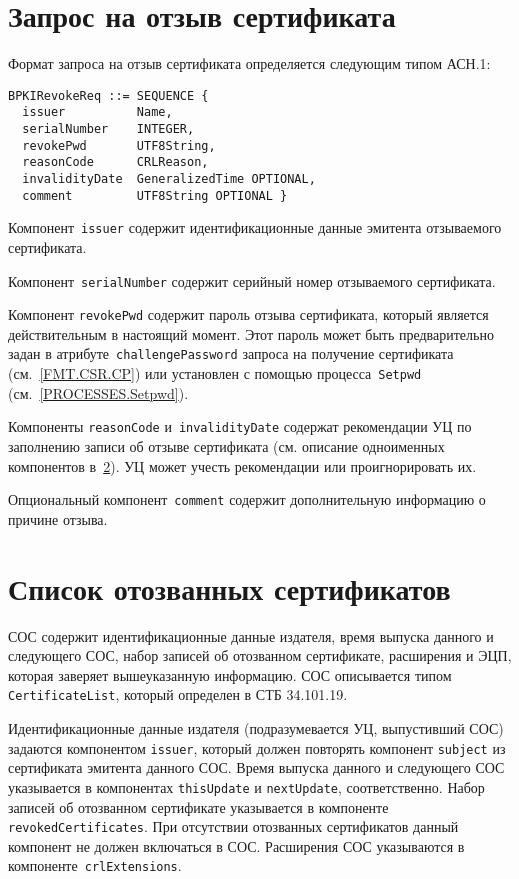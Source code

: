 \section{Запрос на отзыв сертификата}\label{FMT.BPKIRevokeReq}

Формат запроса на отзыв сертификата определяется следующим типом АСН.1:
\begin{verbatim}
BPKIRevokeReq ::= SEQUENCE {
  issuer          Name,
  serialNumber    INTEGER,
  revokePwd       UTF8String,
  reasonCode      CRLReason,
  invalidityDate  GeneralizedTime OPTIONAL,
  comment         UTF8String OPTIONAL }
\end{verbatim}

Компонент~\texttt{issuer} содержит идентификационные данные эмитента 
отзываемого сертификата.

Компонент~\texttt{serialNumber} содержит серийный номер отзываемого 
сертификата.

Компонент \texttt{revokePwd} содержит пароль отзыва
сертификата, который является действительным в 
настоящий момент. Этот пароль может быть предварительно
задан в атрибуте~\texttt{challengePassword} запроса на получение сертификата 
(см.~\ref{FMT.CSR.CP}) или установлен с помощью процесса~\texttt{Setpwd} 
(см.~\ref{PROCESSES.Setpwd}). 

Компоненты \texttt{reasonCode} и~\texttt{invalidityDate}
содержат рекомендации УЦ по заполнению записи об отзыве сертификата
(см. описание одноименных компонентов в~\ref{FMT.CRL}).
УЦ может учесть рекомендации или проигнорировать их.

Опциональный компонент~\texttt{comment} содержит дополнительную информацию 
о причине отзыва.
 
\section{Список отозванных сертификатов}\label{FMT.CRL}

СОС содержит идентификационные данные издателя, время выпуска данного и 
следующего СОС, набор записей об отозванном сертификате, расширения и ЭЦП, 
которая заверяет вышеуказанную информацию. СОС описывается типом 
\texttt{CertificateList}, который определен в СТБ 34.101.19.
 
Идентификационные данные издателя (подразумевается УЦ, 
выпустивший СОС) задаются компонентом \texttt{issuer}, 
который должен повторять компонент \texttt{subject} из 
сертификата эмитента данного СОС.  
%
Время выпуска данного и следующего СОС указывается в 
компонентах \texttt{thisUpdate} и \texttt{nextUpdate}, 
соответственно.
%
Набор записей об отозванном сертификате указывается в компоненте 
\texttt{revokedCertificates}. При отсутствии отозванных  
сертификатов данный компонент не должен включаться в СОС.
%
Расширения СОС указываются в компоненте~\texttt{crlExtensions}.

